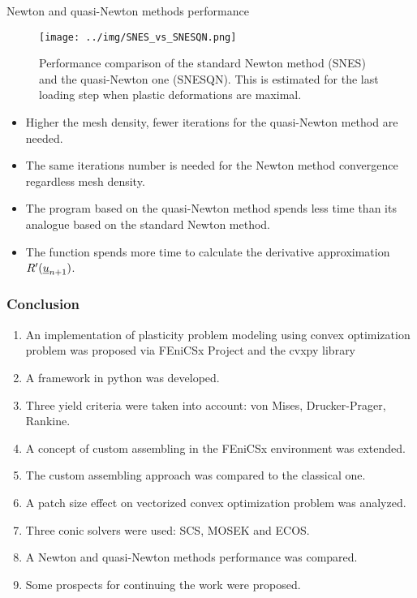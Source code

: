 \documentclass[9pt]{beamer}
\begin{document}
\begin{frame}{Newton and quasi-Newton methods performance}
  \begin{figure}[H]
    \center
    \texttt{[image: ../img/SNES\_vs\_SNESQN.png]}
    \caption{Performance comparison of the standard Newton method (SNES) and the quasi-Newton one (SNESQN). This is estimated for the last loading step when plastic deformations are maximal.}
    \label{fig:SNES_vs_SNESQN}
  \end{figure}
  
  \begin{itemize}
    \item Higher the mesh density, fewer iterations for the quasi-Newton method are needed.
    \item The same iterations number is needed for the Newton method convergence regardless mesh density.
    \item The program based on the quasi-Newton method spends less time than its analogue based on the standard Newton method.
    \item The  function spends more time to calculate the derivative approximation $R^\prime(\underline{u}_{n+1})$.
  \end{itemize}
\end{frame}

\begin{frame}
  \frametitle{Conclusion}

  \begin{enumerate}
    \item An implementation of plasticity problem modeling using convex optimization problem was proposed via FEniCSx Project and the cvxpy library
    \item A framework in python was developed.
    \item Three yield criteria were taken into account: von Mises, Drucker-Prager, Rankine.
    \item A concept of custom assembling in the FEniCSx environment was extended.
    \item The custom assembling approach was compared to the classical one.
    \item A patch size effect on vectorized convex optimization problem was analyzed.
    \item Three conic solvers were used: SCS, MOSEK and ECOS.
    \item A Newton and quasi-Newton methods performance was compared.
    \item Some prospects for continuing the work were proposed.
  \end{enumerate}

\end{frame}
\end{document}
